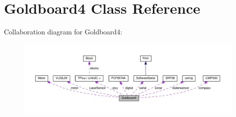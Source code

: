 \hypertarget{class_goldboard4}{}\section{Goldboard4 Class Reference}
\label{class_goldboard4}


Collaboration diagram for Goldboard4\+:
\nopagebreak
\begin{figure}[H]
\begin{center}
\leavevmode
\includegraphics[width=350pt]{class_goldboard4__coll__graph}
\end{center}
\end{figure}
